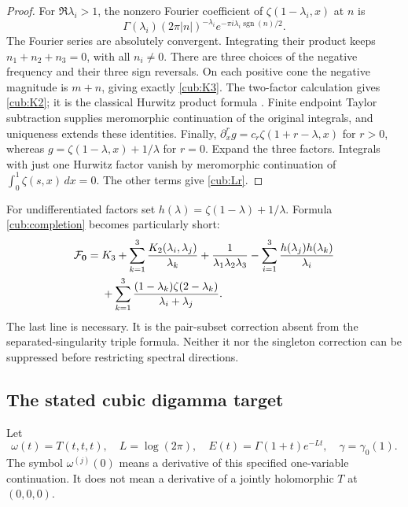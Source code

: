 \begin{proof}
For $\Re\lambda_i>1$, the nonzero Fourier coefficient of
$\zeta(1-\lambda_i,x)$ at $n$ is
\[
 \Gamma(\lambda_i)(2\pi|n|)^{-\lambda_i}
              e^{-\pi i\lambda_i\operatorname{sgn}(n)/2}.
\]
The Fourier series are absolutely convergent.  Integrating their
product keeps $n_1+n_2+n_3=0$, with all $n_i\ne0$.
There are three choices of the negative frequency and their three
sign reversals.  On each positive cone the negative magnitude is
$m+n$, giving exactly \eqref{cub:K3}.  The two-factor calculation
gives \eqref{cub:K2}; it is the classical Hurwitz product formula
\cite{EM2002}.  Finite endpoint Taylor subtraction supplies
meromorphic continuation of the original integrals, and uniqueness
extends these identities.  Finally,
$\partial_x^r g=c_r\zeta(1+r-\lambda,x)$ for $r>0$, whereas
$g=\zeta(1-\lambda,x)+1/\lambda$ for $r=0$.
Expand the three factors.  Integrals with just one Hurwitz factor
vanish by meromorphic continuation of
$\int_0^1\zeta(s,x)\,dx=0$.  The other terms give \eqref{cub:Lr}.
\end{proof}

For undifferentiated factors set
$h(\lambda)=\zeta(1-\lambda)+1/\lambda$.  Formula
\eqref{cub:completion} becomes particularly short:
\begin{align}
 \mathcal F_{\boldsymbol0}={}&K_3+
   \sum_{k=1}^3\frac{K_2(\lambda_i,\lambda_j)}{\lambda_k}
   +\frac{1}{\lambda_1\lambda_2\lambda_3}
   -\sum_{i=1}^3\frac{h(\lambda_j)h(\lambda_k)}{\lambda_i}
       \notag\\
 &+\sum_{k=1}^3\frac{(1-\lambda_k)\zeta(2-\lambda_k)}
                              {\lambda_i+\lambda_j}.
 \label{cub:Fexplicit}
\end{align}
The last line is necessary.  It is the pair-subset correction absent
from the separated-singularity triple formula.  Neither it nor the
singleton correction can be suppressed before restricting spectral
directions.

\subsection{The stated cubic digamma target}

Let
\[
 \omega(t)=T(t,t,t),\quad L=\log(2\pi),\quad
 E(t)=\Gamma(1+t)e^{-Lt},\quad
 \gamma=\gamma_0(1).
\]
The symbol $\omega^{(j)}(0)$ means a derivative of this specified
one-variable continuation.  It does not mean a derivative of a
jointly holomorphic $T$ at $(0,0,0)$.

